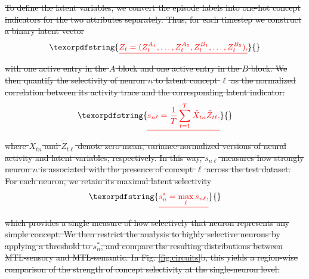 \documentclass{article}
\providecommand{\DIFdeltex}[1]{{\protect\color{red}\sout{#1}}}                      %
\providecommand{\DIFdel}[1]{\texorpdfstring{\DIFdeltex{#1}}{}} %
\begin{document}
\DIFdel{To define the latent variables, we convert the episode labels into one-hot concept indicators for the two attributes separately. Thus, for each timestep we construct a binary latent vector
}\[
\DIFdel{Z_t = (Z_t^{A_1},\dots,Z_t^{A_5},Z_t^{B_1},\dots,Z_t^{B_5}),
}\]%
\DIFdel{with one active entry in the $A$ block and one active entry in the $B$ block. We then quantify the selectivity of neuron $n$ to latent concept $\ell$ as the normalized correlation between its activity trace and the corresponding latent indicator:
}\[
\DIFdel{s_{n\ell}
=
\frac{1}{T}
\sum_{t=1}^{T}
\tilde{X}_{tn}\tilde{Z}_{t\ell},
}\]%
\DIFdel{where $\tilde{X}_{tn}$ and $\tilde{Z}_{t\ell}$ denote zero-mean, variance-normalized versions of neural activity and latent variables, respectively. In this way, $s_{n\ell}$ measures how strongly neuron $n$ is associated with the presence of concept $\ell$ across the test dataset.
}%
\DIFdel{For each neuron, we retain its maximal latent selectivity
}\[
\DIFdel{s_n^\ast = \max_{\ell} s_{n\ell},
}\]%
\DIFdel{which provides a single measure of how selectively that neuron represents any simple concept. We then restrict the analysis to highly selective neurons by applying a threshold to $s_n^\ast$, and compare the resulting distributions between MTL-sensory and MTL-semantic. In Fig. \ref{fig:circuits}b, this yields a region-wise comparison of the strength of concept selectivity at the single-neuron level.
}%

\end{document}
